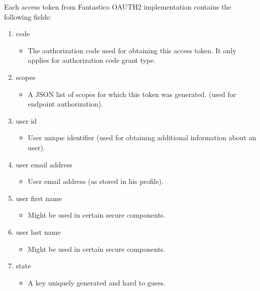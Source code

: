 \documentclass[letterpaper,10pt,english]{sphinxmanual}
\begin{document}
Each access token from Fantastico OAUTH2 implementation contains the following fields:
\begin{enumerate}
\item {} 
code
\begin{itemize}
\item {} 
The authorization code used for obtaining this access token. It only applies for authorization code grant type.

\end{itemize}

\item {} 
scopes
\begin{itemize}
\item {} 
A JSON list of scopes for which this token was generated. (used for endpoint authorization).

\end{itemize}

\item {} 
user id
\begin{itemize}
\item {} 
User unique identifier (used for obtaining additional information about an user).

\end{itemize}

\item {} 
user email address
\begin{itemize}
\item {} 
User email address (as stored in his profile).

\end{itemize}

\item {} 
user first name
\begin{itemize}
\item {} 
Might be used in certain secure components.

\end{itemize}

\item {} 
user last name
\begin{itemize}
\item {} 
Might be used in certain secure components.

\end{itemize}

\item {} 
state
\begin{itemize}
\item {} 
A key uniquely generated and hard to guess.


\end{itemize}
\end{enumerate}
\end{document}
